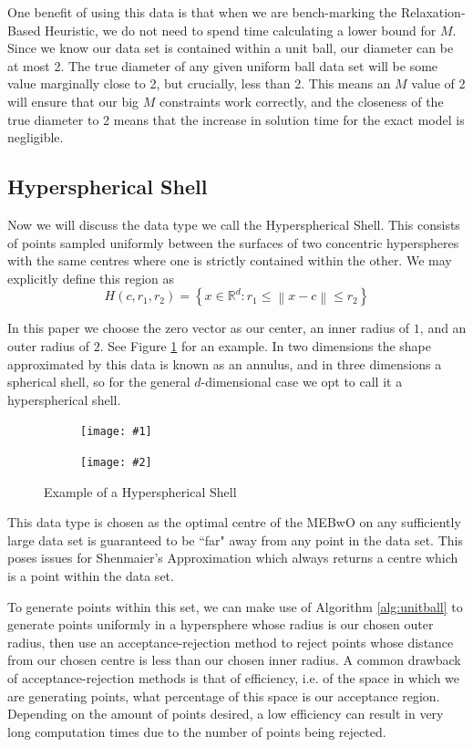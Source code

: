 \documentclass[11pt,twoside]{report}
\newcommand{\norm}[1]{\left\lVert#1\right\rVert} %
\newcommand{\pairfigure}[4]{
    \begin{figure}[ht]
        \centering
        \begin{subfigure}[b]{0.475\textwidth}
            \centering
            \texttt{[image: \#1]}
        \end{subfigure}
        \hfill
        \begin{subfigure}[b]{0.475\textwidth}
            \centering
            \texttt{[image: \#2]}
        \end{subfigure}
        \caption{#3}
        \label{#4}
\end{figure}
}
\newcommand{\datafigure}[3]{
    \pairfigure{data_plots/#1_2d.png}{data_plots/#1_3d.png}{#2}{#3}
}
\theoremstyle{definition}
\numberwithin{theorem}{section}
\numberwithin{definition}{section}
\numberwithin{lemma}{section}
\numberwithin{proposition}{section}
\numberwithin{equation}{section}
\numberwithin{figure}{section}
\begin{document}
One benefit of using this data is that when we are bench-marking the Relaxation-Based Heuristic, we do not need to spend time calculating a lower bound for $M$. Since we know our data set is contained within a unit ball, our diameter can be at most 2. The true diameter of any given uniform ball data set will be some value marginally close to 2, but crucially, less than 2. This means an $M$ value of 2 will ensure that our big $M$ constraints work correctly, and the closeness of the true diameter to 2 means that the increase in solution time for the exact model is negligible.

\subsection{Hyperspherical Shell}
Now we will discuss the data type we call the Hyperspherical Shell. This consists of points sampled uniformly between the surfaces of two concentric hyperspheres with the same centres where one is strictly contained within the other. We may explicitly define this region as
\begin{equation*}
    H(c,r_1,r_2) = \left\{x\in\mathbb{R}^d: r_1 \leq \norm{x-c} \leq r_2\right\}
\end{equation*}

In this paper we choose the zero vector as our center, an inner radius of $1$, and an outer radius of $2$. See Figure \ref{fig:hypshell} for an example. In two dimensions the shape approximated by this data is known as an annulus, and in three dimensions a spherical shell, so for the general $d$-dimensional case we opt to call it a hyperspherical shell.

\datafigure{hyperspherical_shell}{Example of a Hyperspherical Shell}{fig:hypshell}

This data type is chosen as the optimal centre of the MEBwO on any sufficiently large data set is guaranteed to be ``far" away from any point in the data set. This poses issues for Shenmaier's Approximation which always returns a centre which is a point within the data set.

To generate points within this set, we can make use of Algorithm \ref{alg:unitball} to generate points uniformly in a hypersphere whose radius is our chosen outer radius, then use an acceptance-rejection method to reject points whose distance from our chosen centre is less than our chosen inner radius. A common drawback of acceptance-rejection methods is that of efficiency, i.e. of the space in which we are generating points, what percentage of this space is our acceptance region. Depending on the amount of points desired, a low efficiency can result in very long computation times due to the number of points being rejected.
\end{document}
